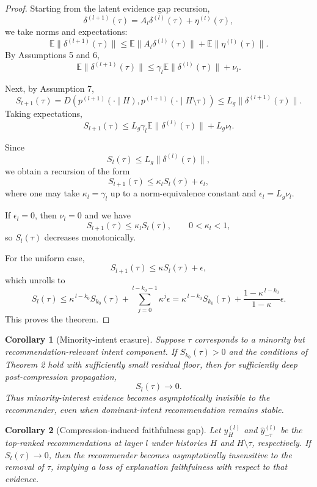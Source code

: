 \documentclass[11pt]{article}
\newtheorem{corollary}{Corollary}
\newcommand{\E}{\mathbb{E}}
\begin{document}
\begin{proof}
Starting from the latent evidence gap recursion,
\[
\delta^{(l+1)}(\tau)
=
A_l \delta^{(l)}(\tau) + \eta^{(l)}(\tau),
\]
we take norms and expectations:
\[
\E\|\delta^{(l+1)}(\tau)\|
\le
\E\|A_l\delta^{(l)}(\tau)\| + \E\|\eta^{(l)}(\tau)\|.
\]
By Assumptions 5 and 6,
\[
\E\|\delta^{(l+1)}(\tau)\|
\le
\gamma_l \E\|\delta^{(l)}(\tau)\| + \nu_l.
\]

Next, by Assumption 7,
\[
S_{l+1}(\tau)
=
D\!\left(p^{(l+1)}(\cdot\mid H), p^{(l+1)}(\cdot\mid H\setminus \tau)\right)
\le
L_g \|\delta^{(l+1)}(\tau)\|.
\]
Taking expectations,
\[
S_{l+1}(\tau)
\le
L_g \gamma_l \E\|\delta^{(l)}(\tau)\| + L_g \nu_l.
\]

Since
\[
S_l(\tau) \le L_g \|\delta^{(l)}(\tau)\|,
\]
we obtain a recursion of the form
\[
S_{l+1}(\tau) \le \kappa_l S_l(\tau) + \epsilon_l,
\]
where one may take $\kappa_l=\gamma_l$ up to a norm-equivalence constant and $\epsilon_l=L_g\nu_l$.

If $\epsilon_l=0$, then $\nu_l=0$ and we have
\[
S_{l+1}(\tau) \le \kappa_l S_l(\tau),
\qquad 0<\kappa_l<1,
\]
so $S_l(\tau)$ decreases monotonically.

For the uniform case,
\[
S_{l+1}(\tau) \le \kappa S_l(\tau) + \epsilon,
\]
which unrolls to
\[
S_l(\tau)
\le
\kappa^{\,l-k_0} S_{k_0}(\tau)
+
\sum_{j=0}^{l-k_0-1}\kappa^j \epsilon
=
\kappa^{\,l-k_0} S_{k_0}(\tau)
+
\frac{1-\kappa^{\,l-k_0}}{1-\kappa}\epsilon.
\]
This proves the theorem.
\end{proof}

\begin{corollary}[Minority-intent erasure]
Suppose $\tau$ corresponds to a minority but recommendation-relevant intent component. If $S_{k_0}(\tau)>0$ and the conditions of Theorem 2 hold with sufficiently small residual floor, then for sufficiently deep post-compression propagation,
\[
S_l(\tau)\to 0.
\]
Thus minority-interest evidence becomes asymptotically invisible to the recommender, even when dominant-intent recommendation remains stable.
\end{corollary}

\begin{corollary}[Compression-induced faithfulness gap]
Let $\hat{y}_H^{(l)}$ and $\hat{y}_{-\tau}^{(l)}$ be the top-ranked recommendations at layer $l$ under histories $H$ and $H\setminus\tau$, respectively. If $S_l(\tau)\to 0$, then the recommender becomes asymptotically insensitive to the removal of $\tau$, implying a loss of explanation faithfulness with respect to that evidence.
\end{corollary}
\end{document}
